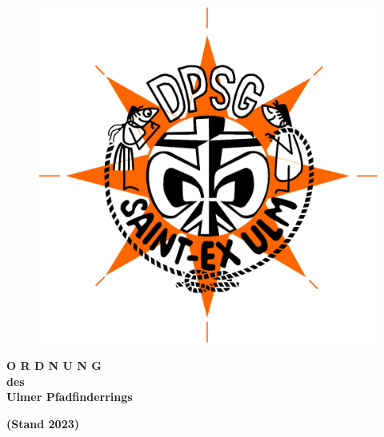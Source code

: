 \begin{titlepage}
\begin{center}
\begin{figure}[h!]
\begin{minipage}{.2\linewidth}
            \end{minipage}%
            \begin{minipage}{.2\linewidth}
                \centering
                \includegraphics[width=\textwidth]{../img/dpsg_st-exupery.jpg}
            \end{minipage}
        \end{figure}
        \vspace{40pt}
        \begin{Huge}
            \textbf{
                O R D N U N G \\
                \vspace{20pt}
                des\\ 
                \vspace{20pt}
                Ulmer Pfadfinderrings\\
                \vspace{20pt}
            }
        \end{Huge}
        \begin{Large}
            \textbf{
                (Stand 2023)
            }
        \end{Large}
    \end{center}
    \vspace{150pt}
    \vspace*{\fill}
\end{titlepage}
